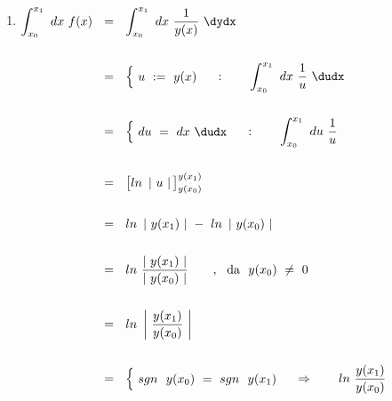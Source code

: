 

\newpage



\section{~}

~\\

\begin{enumerate}[leftmargin=*, labelsep=2em, itemsep=3em, label=\alph*)]



	\item $\begin{aligned}[t]
	\int_{x_0}^{x_1} ~ dx ~ f(x) ~~ &= ~~ \int_{x_0}^{x_1} ~ dx ~ \frac{1}{y(x)} ~ \dydx \\ \\
	&= ~~ {\begin{cases}
		~ u ~ := ~ y(x) ~
	\end{cases}} : \qquad \int_{x_0}^{x_1} ~ dx ~ \frac{1}{u} ~ \dudx \\ \\
	&= ~~ {\begin{cases}
		~ du ~ = ~  dx ~ \dudx ~
	\end{cases}} : \qquad \int_{x_0}^{x_1} ~ du ~ \frac{1}{u} \\ \\
	&= ~~ {\big[ ln ~ \left| ~ u ~ \right| \big]}_{y(x_0)}^{y(x_1)} \\ \\
	&= ~~ ln ~ \left| ~ y(x_1) ~ \right| ~ - ~ ln ~ \left| ~ y(x_0) ~ \right| \\ \\
	&= ~~ ln ~ \frac{ \left| ~ y(x_1) ~ \right| }{ \left| ~ y(x_0) ~ \right| } \qquad, ~~ \text{da ~} y(x_0) ~ \neq ~ 0 \\ \\
	&= ~~ ln ~ \left| ~ \frac{ y(x_1) }{ y(x_0) } ~ \right| \\ \\
	&= ~~ \begin{cases}
		~ sgn ~~ y(x_0) ~ = ~ sgn ~~ y(x_1) ~
	\end{cases} \Rightarrow \qquad ln ~ \frac{ y(x_1) }{ y(x_0) }  \\ \\
	\end{aligned}$
	
	
	

\end{enumerate}
